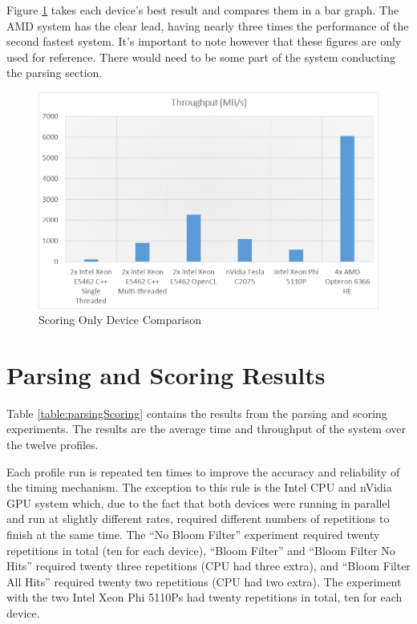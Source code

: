Figure \ref{fig:scoringOnlyBest} takes each device's best result and compares
them in a bar graph. The AMD system has the clear lead, having nearly three
times the performance of the second fastest system. It's important to note
however that these figures are only used for reference. There would need to
be some part of the system conducting the parsing section.

\begin{figure}[H]
\centering
\includegraphics[width=\linewidth]{images/scoringOnlyBest.png}
\caption{Scoring Only Device Comparison}
\label{fig:scoringOnlyBest}
\end{figure}

\section{Parsing and Scoring Results}

Table \ref{table:parsingScoring} contains the results from the parsing and
scoring experiments. The results are the average time and throughput of the
system over the twelve profiles.

Each profile run is repeated ten times to improve the accuracy and reliability
of the timing mechanism. The exception to this rule is the Intel CPU and nVidia
GPU system which, due to the fact that both devices were running in parallel and
run at slightly different rates, required different numbers of repetitions to
finish at the same time. The ``No Bloom Filter'' experiment required twenty
repetitions in total (ten for each device), ``Bloom Filter'' and ``Bloom Filter
No Hits'' required twenty three repetitions (CPU had three extra), and ``Bloom
Filter All Hits'' required twenty two repetitions (CPU had two extra). The
experiment with the two Intel Xeon Phi 5110Ps had twenty repetitions in total,
ten for each device.

